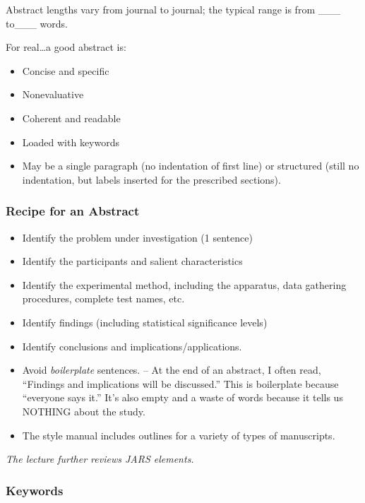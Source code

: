 \documentclass[
  english,
]{book}
\providecommand{\tightlist}{%
  \setlength{\itemsep}{0pt}\setlength{\parskip}{0pt}}
\begin{document}
Abstract lengths vary from journal to journal; the typical range is from \_\_\_ to\_\_\_ words.

For real\ldots a good abstract is:

\begin{itemize}
\tightlist
\item
  Concise and specific
\item
  Nonevaluative
\item
  Coherent and readable
\item
  Loaded with keywords
\item
  May be a single paragraph (no indentation of first line) or structured (still no indentation, but labels inserted for the prescribed sections).
\end{itemize}

\hypertarget{recipe-for-an-abstract}{%
\subsubsection{Recipe for an Abstract}\label{recipe-for-an-abstract}}

\begin{itemize}
\tightlist
\item
  Identify the problem under investigation (1 sentence)
\item
  Identify the participants and salient characteristics
\item
  Identify the experimental method, including the apparatus, data gathering procedures, complete test names, etc.
\item
  Identify findings (including statistical significance levels)
\item
  Identify conclusions and implications/applications.
\item
  Avoid \emph{boilerplate} sentences.
  -- At the end of an abstract, I often read, ``Findings and implications will be discussed.'' This is boilerplate because ``everyone says it.'' It's also empty and a waste of words because it tells us NOTHING about the study.
\item
  The style manual includes outlines for a variety of types of manuscripts.
\end{itemize}

\emph{The lecture further reviews JARS elements.}

\hypertarget{keywords}{%
\subsubsection{Keywords}\label{keywords}}
\end{document}
